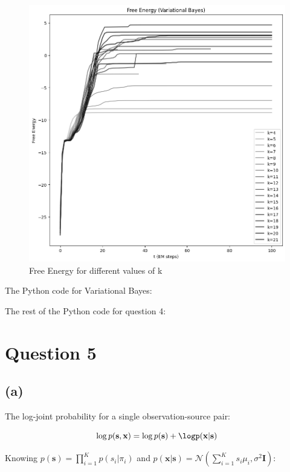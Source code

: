 \documentclass[12pt]{article}
\begin{document}
\newpage
\begin{figure}[h]
\centering
\includegraphics[scale=0.8]{outputs/q4/b-free-energy}
\caption{Free Energy for different values of k}
\label{fig:}
\end{figure}

\newpage
The Python code for Variational Bayes:


\newpage
The rest of the Python code for question 4:


\newpage
\section*{Question 5}

\subsection*{(a)}

The log-joint probability for a single observation-source pair:

\[\log p(\textbf{s}, \textbf{x}) = \log p(\textbf{s}) + \logp(\textbf{x}|\textbf{s})\]

Knowing $p(\textbf{s}) = \prod_{i=1}^{K}p(s_i| \pi_i)$ and $p(\textbf{x}|\textbf{s}) = \mathcal{N}(\sum_{i=1}^{K} s_i \mu_i, \sigma^2 \textbf{I})$:
\end{document}
